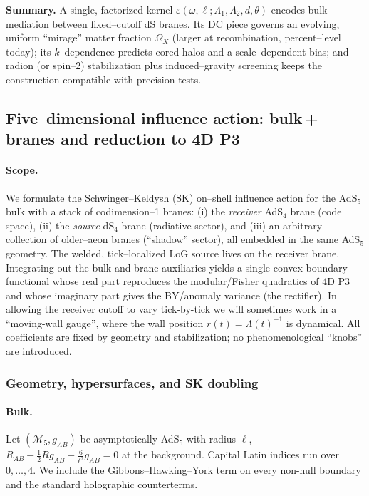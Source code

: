 \documentclass[10pt]{article}
\theoremstyle{definition}
\theoremstyle{plain}
\begin{document}
\medskip
\noindent\textbf{Summary.}
A single, factorized kernel $\varepsilon(\omega,\ell;\Lambda_1,\Lambda_2,d,\theta)$
encodes bulk mediation between fixed–cutoff dS branes. Its DC piece governs an evolving,
uniform ``mirage'' matter fraction $\Omega_X$ (larger at recombination, percent–level
today); its $k$–dependence predicts cored halos and a scale–dependent bias; and radion
(or spin–2) stabilization plus induced–gravity screening keeps the construction compatible
with precision tests.


\subsection{Five–dimensional influence action: bulk\,+\,branes and reduction to 4D P3}
\label{subsec:5D-influence}

\paragraph{Scope.} \label{par:uom-main-071}
We formulate the Schwinger–Keldysh (SK) on–shell influence action for the AdS$_5$ bulk with a stack of codimension–1 branes:
(i) the \emph{receiver} AdS$_4$ brane (code space), 
(ii) the \emph{source} dS$_4$ brane (radiative sector),
and (iii) an arbitrary collection of older–aeon branes (``shadow'' sector), all embedded in the same AdS$_5$ geometry.
The welded, tick–localized LoG source lives on the receiver brane. 
Integrating out the bulk and brane auxiliaries yields a single convex boundary functional whose real part reproduces the modular/Fisher quadratics of 4D P3 and whose imaginary part gives the BY/anomaly variance (the rectifier). In allowing the receiver cutoff to vary tick-by-tick we will sometimes work in a “moving-wall gauge”, where the wall position $r(t)=\Lambda(t)^{-1}$ is dynamical.
All coefficients are fixed by geometry and stabilization; no phenomenological ``knobs'' are introduced.

\subsubsection{Geometry, hypersurfaces, and SK doubling}
\label{subsubsec:5D-geom-SK}

\paragraph{Bulk.}\label{par:uom-main-072}
Let $(\mathcal M_5,g_{AB})$ be asymptotically AdS$_5$ \cite{Maldacena1998,Witten1998AdSCFT,GubserKlebanovPolyakov1998} with radius $\ell$,
\(
R_{AB}-\tfrac12 R g_{AB}-\tfrac{6}{\ell^2} g_{AB}=0
\)
at the background. Capital Latin indices run over $0,\dots,4$.
We include the Gibbons–Hawking–York term on every non-null boundary and the standard holographic counterterms.
\end{document}
